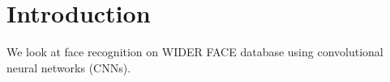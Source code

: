\documentclass[a4paper, 12pt]{book}
\newcommand{\ttitle}{Assignment \#2}
\newcommand{\tauthor}{Tilen Kavčič}
\newcommand{\clearemptydoublepage}{\newpage{\pagestyle{empty}\cleardoublepage}}
\begin{document}












\mainmatter
\setcounter{page}{1}
\pagestyle{fancy}

\chapter{Introduction}
We look at face recognition on WIDER FACE database using convolutional neural networks (CNNs).
\end{document}
